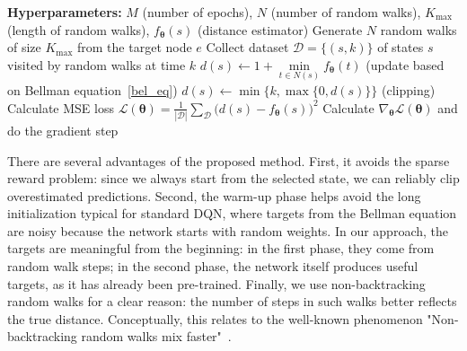 \documentclass[reqno,11pt]{amsart}
\begin{document}

\begin{algorithm}[t]
 \caption{Modified deep Q-learning}
 \label{alg:deepQ_modified}
 \begin{algorithmic}[1]
 \STATE \textbf{Hyperparameters:} $M$ (number of epochs), $N$ (number of random walks), $K_{\max}$ (length of random walks), $f_{\boldsymbol \theta}(s)$ (distance estimator)
 \STATE Generate $N$ random walks of size $K_{\max}$ from the target node $e$
 \STATE Collect dataset $\mathcal D = \{(s, k)\}$ of states $s$ visited by random walks at time $k$
  \STATE 
  $d(s) \leftarrow  1 + \min\limits_{t \in N(s)}f_{\boldsymbol \theta}(t)$ (update based on Bellman equation~\eqref{bel_eq})
  \STATE $d(s) \leftarrow \min\{k, \max\{0, d(s)\}\}$ (clipping)
 \ENDFOR
 \STATE Calculate MSE loss $\mathcal L(\boldsymbol \theta) = \frac 1{|\mathcal D|} \sum\limits_{\mathcal D}\big(d(s) - f_{\boldsymbol \theta}(s)\big)^2$
 \STATE Calculate $\nabla_{\boldsymbol \theta} \mathcal L(\boldsymbol \theta)$ and do the gradient step
 \ENDFOR
 \end{algorithmic}

 \end{algorithm}

There are several advantages of the proposed method. First, it avoids the sparse reward problem: since we always start from the selected state, we can reliably clip overestimated predictions. Second, the warm-up phase helps avoid the long initialization typical for standard DQN, where targets from the Bellman equation are noisy because the network starts with random weights. In our approach, the targets are meaningful from the beginning: in the first phase, they come from random walk steps; in the second phase, the network itself produces useful targets, as it has already been pre-trained. Finally, we use non-backtracking random walks for a clear reason: the number of steps in such walks better reflects the true distance. Conceptually, this relates to the well-known phenomenon "Non-backtracking random walks mix faster"~\cite{alon2007non}.

\end{document}
